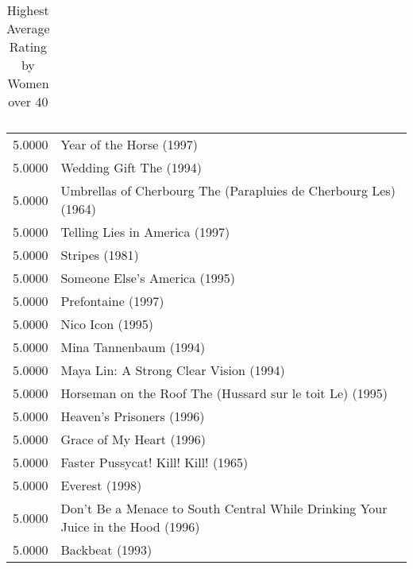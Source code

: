 \begin{flushleft}
\begin{table}[h]
\begin{tabular}{ll}
\end{tabular}
\caption{Highest Average Rating by Women over 40}
\end{table}



\begin{table}[h]
\centering
\begin{tabular}{ll}
5.0000 & Year of the Horse (1997)                                                        \\
5.0000 & Wedding Gift The (1994)                                                         \\
5.0000 & Umbrellas of Cherbourg The (Parapluies de Cherbourg Les) (1964)                 \\
5.0000 & Telling Lies in America (1997)                                                  \\
5.0000 & Stripes (1981)                                                                  \\
5.0000 & Someone Else's America (1995)                                                   \\
5.0000 & Prefontaine (1997)                                                              \\
5.0000 & Nico Icon (1995)                                                                \\
5.0000 & Mina Tannenbaum (1994)                                                          \\
5.0000 & Maya Lin: A Strong Clear Vision (1994)                                          \\
5.0000 & Horseman on the Roof The (Hussard sur le toit Le) (1995)                        \\
5.0000 & Heaven's Prisoners (1996)                                                       \\
5.0000 & Grace of My Heart (1996)                                                        \\
5.0000 & Faster Pussycat! Kill! Kill! (1965)                                             \\
5.0000 & Everest (1998)                                                                  \\
5.0000 & Don't Be a Menace to South Central While Drinking Your Juice in the Hood (1996) \\
5.0000 & Backbeat (1993)                                                                 \\ \hline

\end{tabular}
\end{table}
\end{flushleft}
